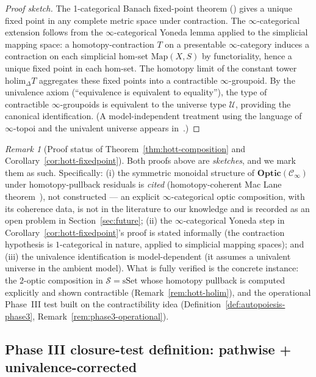 \documentclass[11pt,a4paper]{article}
\theoremstyle{plain}
\theoremstyle{definition}
\theoremstyle{remark}
\newtheorem{remark}[theorem]{Remark}
\newcommand{\Optic}{\mathbf{Optic}}
\begin{document}
\begin{proof}[Proof sketch]
The 1-categorical Banach fixed-point theorem (\cite{banach1922}) gives
a unique fixed point in any complete metric space under contraction.
The $\infty$-categorical extension follows from the $\infty$-categorical
Yoneda lemma applied to the simplicial mapping space: a
homotopy-contraction $T$ on a presentable $\infty$-category induces a
contraction on each simplicial hom-set $\mathrm{Map}(X, S)$ by functoriality,
hence a unique fixed point in each hom-set. The homotopy limit of the
constant tower $\mathrm{holim}_\Delta T$ aggregates these fixed points
into a contractible $\infty$-groupoid. By the univalence axiom
(``equivalence is equivalent to equality''), the type of contractible
$\infty$-groupoids is equivalent to the universe type $\mathcal{U}$,
providing the canonical identification. (A model-independent treatment
using the language of $\infty$-topoi and the univalent universe appears
in~\cite{cisinski2019}.)
\end{proof}

\begin{remark}[Proof status of Theorem~\ref{thm:hott-composition} and
Corollary~\ref{cor:hott-fixedpoint}]
\label{rem:proof-status-hott}
Both proofs above are \emph{sketches}, and we mark them as such.
Specifically: (i) the symmetric monoidal structure of
$\Optic(\mathcal{C}_\infty)$ under homotopy-pullback residuals is
\emph{cited} (homotopy-coherent Mac Lane
theorem~\cite[Thm.~2.4.3]{lurie2017ha}), not constructed
--- an explicit $\infty$-categorical optic composition, with its
coherence data, is not in the literature to our knowledge and is
recorded as an open problem in Section~\ref{sec:future};
(ii) the $\infty$-categorical Yoneda step in
Corollary~\ref{cor:hott-fixedpoint}'s proof is stated informally
(the contraction hypothesis is $1$-categorical in nature, applied to
simplicial mapping spaces); and (iii) the univalence identification
is model-dependent (it assumes a univalent universe in the ambient
model). What is fully verified is the concrete instance: the
$2$-optic composition in $\mathcal{S}=\mathrm{sSet}$ whose homotopy
pullback is computed explicitly and shown contractible
(Remark~\ref{rem:hott-holim}), and the operational Phase~III test
built on the contractibility idea
(Definition~\ref{def:autopoiesis-phase3},
Remark~\ref{rem:phase3-operational}).
\end{remark}

\subsection{Phase III closure-test definition: pathwise + univalence-corrected}
\label{sec:phase3}
\end{document}
